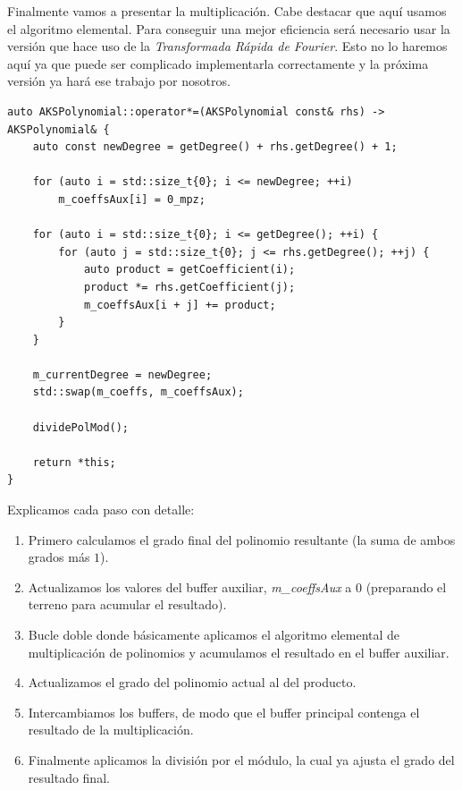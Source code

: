 Finalmente vamos a presentar la multiplicación. Cabe destacar que aquí usamos el algoritmo elemental. Para conseguir una mejor eficiencia será necesario usar la versión que hace uso de la \textit{Transformada Rápida de Fourier}. Esto no lo haremos aquí ya que puede ser complicado implementarla correctamente y la próxima versión ya hará ese trabajo por nosotros.\\

\begin{lstlisting}
auto AKSPolynomial::operator*=(AKSPolynomial const& rhs) -> AKSPolynomial& {
	auto const newDegree = getDegree() + rhs.getDegree() + 1;
	
	for (auto i = std::size_t{0}; i <= newDegree; ++i)
		m_coeffsAux[i] = 0_mpz;
	
	for (auto i = std::size_t{0}; i <= getDegree(); ++i) {
		for (auto j = std::size_t{0}; j <= rhs.getDegree(); ++j) {
			auto product = getCoefficient(i);
			product *= rhs.getCoefficient(j);
			m_coeffsAux[i + j] += product;
		}
	}
	
	m_currentDegree = newDegree;
	std::swap(m_coeffs, m_coeffsAux);
	
	dividePolMod();
	
	return *this;
}
\end{lstlisting}

Explicamos cada paso con detalle:

\begin{enumerate}
	\item Primero calculamos el grado final del polinomio resultante (la suma de ambos grados más $1$).
	
	\item Actualizamos los valores del buffer auxiliar, \textit{m\_coeffsAux} a $0$ (preparando el terreno para acumular el resultado).
	
	\item Bucle doble donde básicamente aplicamos el algoritmo elemental de multiplicación de polinomios y acumulamos el resultado en el buffer auxiliar.
	
	\item Actualizamos el grado del polinomio actual al del producto.
	
	\item Intercambiamos los buffers, de modo que el buffer principal contenga el resultado de la multiplicación.
	
	\item Finalmente aplicamos la división por el módulo, la cual ya ajusta el grado del resultado final.
\end{enumerate}

